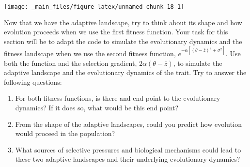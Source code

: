 \documentclass[
]{book}
\begin{document}
\texttt{[image: \_main\_files/figure-latex/unnamed-chunk-18-1]}

Now that we have the adaptive landscape, try to think about its shape and how evolution proceeds when we use the first fitness function. Your task for this section will be to adapt the code to simulate the evolutionary dynamics and the fitness landscape when we use the second fitness function, \(e^{-\alpha\left[\left(\theta-\overline{z}\right)^2 + \sigma^2\right]}\). Use both the function and the selection gradient, \(2\alpha (\theta-\overline{z})\), to simulate the adaptive landscape and the evolutionary dynamics of the trait. Try to answer the following questions:

\begin{enumerate}
\def\labelenumi{\arabic{enumi}.}
\item
  For both fitness functions, is there and end point to the evolutionary dynamics? If it does so, what would be this end point?
\item
  From the shape of the adaptive landscapes, could you predict how evolution would proceed in the population?
\item
  What sources of selective pressures and biological mechanisms could lead to these two adaptive landscapes and their underlying evolutionary dynamics?
\end{enumerate}

  
\end{document}
